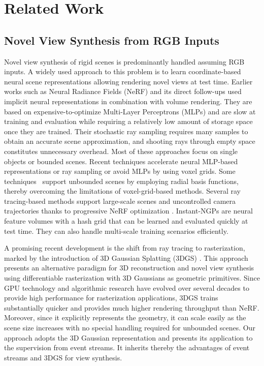 \section{Related Work}\label{sec:Related_Work}

\subsection{Novel View Synthesis from RGB Inputs}\label{ssec:RW_RGB}
Novel view synthesis of rigid scenes is predominantly handled assuming RGB inputs. A widely used approach to this problem is to learn coordinate-based neural scene representations allowing rendering novel views at test time. 
Earlier works such as Neural Radiance Fields (NeRF) and its direct follow-ups \cite{nerf, Tewari2022NeuRendSTAR} used implicit neural representations in combination with volume rendering.
They are based on expensive-to-optimize Multi-Layer Perceptrons (MLPs) and are slow at training and evaluation while requiring a relatively low amount of storage space once they are trained.
Their stochastic ray sampling requires many samples to obtain an accurate scene approximation, and shooting rays through empty space constitutes unnecessary overhead. Most of these approaches focus on single objects or bounded scenes. 
Recent techniques accelerate neural MLP-based representations or ray sampling \cite{Reiser2021ICCV, instantngp} or avoid MLPs \cite{Sun2022DirectVG, YuFridovichKeil2022, zipnerf} by using voxel grids. 
Some techniques~\cite{neurbf} support unbounded scenes by employing radial basis functions, thereby overcoming the limitations of voxel-grid-based methods. 
Several ray tracing-based methods support large-scale scenes and uncontrolled camera trajectories thanks to progressive NeRF optimization \cite{xiangli2022bungeenerf, meuleman2023localrf}.
Instant-NGPs \cite{instantngp} are neural feature volumes with a hash grid that can be learned and evaluated quickly at test time. They can also handle multi-scale training scenarios efficiently. 


A promising recent development is the shift from ray tracing to rasterization, marked by the introduction of 3D Gaussian Splatting (3DGS) \cite{3dgs}.
This approach presents an alternative paradigm for 3D reconstruction and novel view synthesis using differentiable rasterization with 3D Gaussians as geometric primitives.
Since GPU technology and algorithmic research have evolved over several decades to provide high performance for rasterization applications,
3DGS trains substantially quicker and provides much higher rendering throughput than NeRF. Moreover, since it explicitly represents the geometry, it can scale easily as the scene size increases with no special handling required for unbounded scenes. Our approach adopts the 3D Gaussian representation and presents its application to the supervision from event streams. It inherits thereby the advantages of event streams and 3DGS for view synthesis. 

